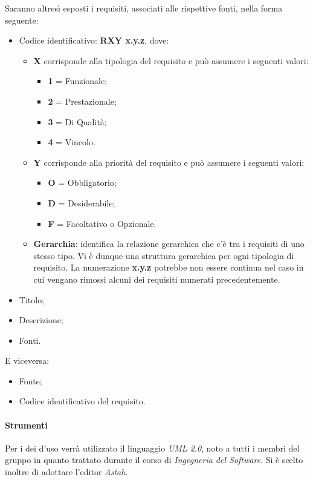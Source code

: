 			Saranno altresì esposti i requisiti, associati alle rispettive fonti, nella forma seguente:
				\begin{itemize}
				\item Codice identificativo: \textbf{R{X}{Y} x.y.z}, dove:
				      \begin{itemize}
						\item \textbf{X} corrisponde alla tipologia del requisito e può assumere i seguenti valori:
							\begin{itemize}
								\item \textbf{1} = Funzionale;
								\item \textbf{2} = Prestazionale;
								\item \textbf{3} = Di Qualità;
								\item \textbf{4} = Vincolo.
							\end{itemize}
						\item \textbf{Y} corrisponde alla priorità del requisito e può assumere i seguenti valori:
							\begin{itemize}
								\item \textbf{O} = Obbligatorio;
								\item \textbf{D} = Desiderabile;
								\item \textbf{F} = Facoltativo o Opzionale.
							\end{itemize}
						\item \textbf{Gerarchia}: identifica la relazione gerarchica che c’è tra i requisiti di uno stesso
						tipo. Vi è dunque una struttura gerarchica per ogni tipologia di requisito.
						La numerazione \textbf{x.y.z} potrebbe non essere continua nel caso in cui vengano
						rimossi alcuni dei requisiti numerati precedentemente.
				      \end{itemize}
				\item Titolo;
				\item Descrizione;
                \item Fonti.
				\end{itemize}
			E viceversa:
				\begin{itemize}
				\item Fonte;
				\item Codice identificativo del requisito.
				\end{itemize}
			\paragraph*{Strumenti}
				Per i  dei  d'uso verrà utilizzato il linguaggio \textit{UML 2.0},
				noto a tutti i membri del gruppo in quanto trattato durante il corso
				di \textit{Ingegneria del Software}.
				Si \`e scelto inoltre di adottare l'editor  \textit{Astah}.   %
			
